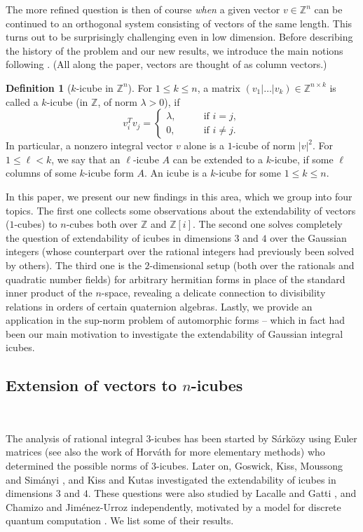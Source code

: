 \documentclass[11pt]{amsart}
\newcommand{\ZZ}{\mathbb{Z}}
\theoremstyle{definition}
\newtheorem*{definition}{Definition}
\theoremstyle{remark}
\begin{document}
The more refined question is then of course \emph{when} a given vector $v\in\ZZ^n$ can be continued to an orthogonal system consisting of vectors of the same length. This turns out to be surprisingly challenging even in low dimension. Before describing the history of the problem and our new results, we introduce the main notions following
\cite{GoswickKissMoussongSimanyi}. (All along the paper, vectors are thought of as column vectors.)
\begin{definition}[$k$-icube in $\ZZ^n$] For $1\leq k\leq n$, a matrix $(v_1|\dotsc|v_k)\in \ZZ^{n\times k}$ is called a $k$-icube (in $\ZZ$, of norm $\lambda > 0$),
if
\[
v_i^T v_j = \begin{cases} \lambda, \qquad & \text{if $i=j$}, \\ 0, & \text{if $i\neq j$.} \end{cases}
\]
In particular, a nonzero integral vector $v$ alone is a $1$-icube of norm $|v|^2$. For $1\leq\ell < k$, we say that an $\ell$-icube $A$ can be extended to a $k$-icube, if some $\ell$ columns of some $k$-icube form $A$. An icube is a $k$-icube for some $1\leq k\leq n$.
\end{definition}

In this paper, we present our new findings in this area, which we group into four topics. The first one collects some observations about the extendability of vectors ($1$-cubes) to $n$-cubes both over $\ZZ$ and $\ZZ[i]$.  The second one solves completely the question of extendability of icubes in dimensions $3$ and $4$ over the Gaussian integers (whose counterpart over the rational integers had previously been solved by others). The third one is the $2$-dimensional setup (both over the rationals and quadratic number fields) for arbitrary hermitian forms in place of the standard inner product of the $n$-space, revealing a delicate connection to divisibility relations in orders of certain quaternion algebras. Lastly, we provide an application in the sup-norm problem of automorphic forms -- which in fact had been our main motivation to investigate the extendability of Gaussian integral icubes.


\subsection{Extension of vectors to $n$-icubes}~

The analysis of rational integral $3$-icubes has been started by Sárközy \cite{Sarkozy} using Euler matrices (see also the work of Horváth \cite{Horvath} for more elementary methods) who determined the possible norms of $3$-icubes. Later on, Goswick, Kiss, Moussong and Simányi \cite{GoswickKissMoussongSimanyi}, and Kiss and Kutas \cite{KissKutas} investigated the extendability of icubes in dimensions $3$ and $4$. These questions were also studied by Lacalle and Gatti \cite{LacalleGatti}, and Chamizo and Jiménez-Urroz \cite{ChamizoJimenezUrroz} independently, motivated by a model for discrete quantum computation \cite{GattiLacalle}. We list some of their results.
\end{document}
